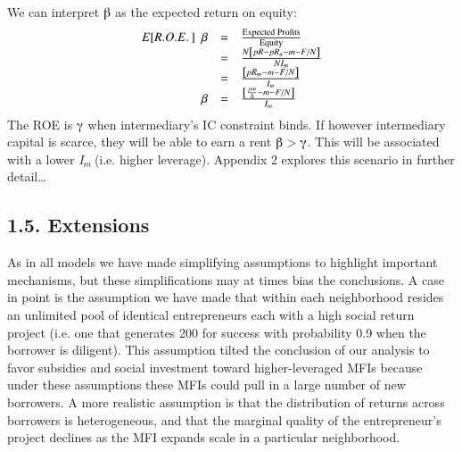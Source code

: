 \documentclass{article} %
\begin{document}
We can interpret $\mathrm{\betaup }$ as the expected return on equity:
\begin{equation} \label{15)} 
\begin{array}{rcl} {E[R.O.E.\, ]\, \, \, \beta } & {=} & {\frac{{\rm Expected\; Profits}}{{\rm Equity}} } \\ {} & {=} & {\frac{N\left[pR-pR_{u} -m-F/N\right]}{NI_{m} } } \\ {} & {=} & {\frac{\left[pR_{m} -m-F/N\right]}{I_{m} } } \\ {\beta } & {=} & {\frac{\left[\frac{pm}{\Delta } -m-F/N\right]}{I_{m} } } \end{array} 
\end{equation} 
The ROE is $\mathrm{\gammaup }$ when intermediary's IC constraint binds.  If however intermediary capital is scarce, they will be able to earn a rent $\mathrm{\betaup }$$\mathrm{>}$$\mathrm{\gammaup }$.  This will be associated with a lower \textit{I${}_{m}$${}_{\ }$}(i.e. higher leverage).  Appendix 2 explores this scenario in further detail{\dots}

\noindent 

\noindent 
\subsection{1.5. Extensions}

As in all models we have made simplifying assumptions to highlight important mechanisms, but these simplifications may at times bias the conclusions.  A case in point is the assumption we have made that within each neighborhood resides an unlimited pool of identical entrepreneurs each with a high social return project (i.e. one that generates 200 for success with probability 0.9 when the borrower is diligent).  This assumption tilted the conclusion of our analysis to favor subsidies and social investment toward higher-leveraged MFIs because under these assumptions these MFIs could pull in a large number of new borrowers.  A more realistic assumption is that the distribution of returns across borrowers is heterogeneous, and that the marginal quality of the entrepreneur's project declines as the MFI expands scale in a particular neighborhood. 
\end{document}
